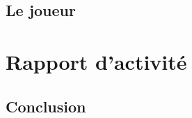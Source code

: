 \documentclass{report}
\begin{document}
	\chapter{Le joueur}

\part{Rapport d'activité}


\chapter*{Conclusion}
\end{document}
